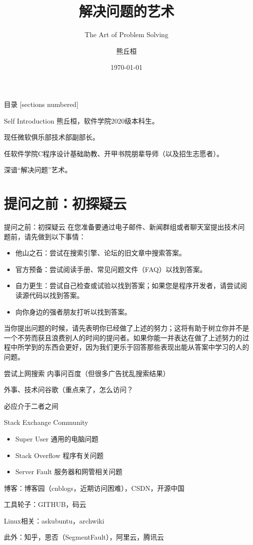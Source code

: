 \documentclass[10pt]{beamer}
\title{解决问题的艺术}
\subtitle{The Art of Problem Solving}
\date{\today}
\author{熊丘桓}
\institute{南京大学微软俱乐部}
\begin{document}
\maketitle

\begin{frame}{目录}
    [sections numbered]
    \tableofcontents[hideallsubsections]
\end{frame}


\begin{frame}[fragile]{Self Introduction}
    熊丘桓，软件学院2020级本科生。

    现任微软俱乐部技术部副部长。

    任软件学院C程序设计基础助教、开甲书院朋辈导师（以及招生志愿者）。

    深谙“解决问题”艺术。
\end{frame}

\section{提问之前：初探疑云}

\begin{frame}[fragile]{提问之前：初探疑云}
    在您准备要通过电子邮件、新闻群组或者聊天室提出技术问题前，请先做到以下事情：
    \begin{itemize}
        \item 他山之石：尝试在搜索引擎、论坛的旧文章中搜索答案。
        \item 官方预备：尝试阅读手册、常见问题文件（FAQ）以找到答案。
        \item 自力更生：尝试自己检查或试验以找到答案；如果您是程序开发者，请尝试阅读源代码以找到答案。
        \item 向你身边的强者朋友打听以找到答案。
    \end{itemize}

    当你提出问题的时候，请先表明你已经做了上述的努力；这将有助于树立你并不是一个不劳而获且浪费别人的时间的提问者。如果你能一并表达在做了上述努力的过程中所学到的东西会更好，因为我们更乐于回答那些表现出能从答案中学习的人的问题。
\end{frame}

\begin{frame}[fragile]{尝试上网搜索}
    内事问百度（但很多广告扰乱搜索结果）

    外事、技术问谷歌（重点来了，怎么访问？

    必应介于二者之间

    Stack Exchange Community

    \begin{itemize}
        \item Super User 通用的电脑问题
        \item Stack Overflow 程序有关问题
        \item Server Fault 服务器和网管相关问题
    \end{itemize}
    博客：博客园（cnblogs，近期访问困难），CSDN，开源中国

    工具轮子：GITHUB，码云

    Linux相关：askubuntu，archwiki

    此外：知乎，思否（SegmentFault），阿里云，腾讯云
\end{frame}
\end{document}
